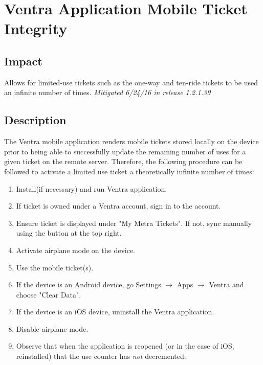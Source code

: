 \documentclass[12pt,conference]{IEEEtran}
\begin{document}
\section{Ventra Application Mobile Ticket Integrity}

\subsection{Impact}
Allows for limited-use tickets such as the one-way and ten-ride tickets to be used an infinite number of times. \emph{Mitigated 6/24/16 in release 1.2.1.39}

\subsection{Description}
The Ventra mobile application renders mobile tickets stored locally on the device prior to being able to successfully update the remaining number of uses for a given ticket on the remote server. Therefore, the following procedure can be followed to activate a limited use ticket a theoretically infinite number of times:
\begin{enumerate}
        \item Install(if necessary) and run Ventra application.
        \item If ticket is owned under a Ventra account, sign in to the account.
        \item Ensure ticket is displayed under "My Metra Tickets". If not, sync manually using the button at the top right.
        \item Activate airplane mode on the device.
        \item Use the mobile ticket(s).
        \item If the device is an Android device, go Settings $\rightarrow$ Apps $\rightarrow$ Ventra and choose "Clear Data".
        \item If the device is an iOS device, uninstall the Ventra application.
        \item Disable airplane mode.
        \item Observe that when the application is reopened (or in the case of iOS, reinstalled) that the use counter has \emph{not} decremented.
\end{enumerate}
\end{document}
